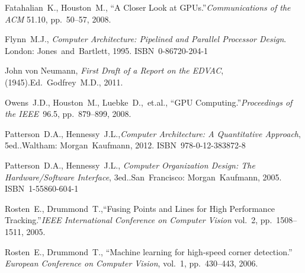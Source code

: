 {\raggedright
	\begin{thebibliography}{99}
		
			Fatahalian~K., Houston~M.,
			``A Closer Look at GPUs.''\linebreak[1]
			\textit{Communications of the ACM} 51.10, pp.~50--57, 2008.
		
			Flynn~M.J.,
			\textit{Computer Architecture: Pipelined and Parallel Processor Design}.
			\linebreak[3]
			London: Jones~and~Bartlett, 1995. ISBN~0-86720-204-1
		
			John von Neumann,
			\textit{First Draft of a Report on the EDVAC}, (1945).\linebreak[2]
			Ed.~Godfrey~M.D., 2011.
		
			Owens~J.D., Houston~M., Luebke~D.,~et.al.,
			``GPU Computing.''\linebreak[1]
			\textit{Proceedings of the IEEE}~96.5, pp.~879--899,
			2008.
		
			Patterson~D.A., Hennessy~J.L.,\linebreak[1]
			\textit{Computer Architecture: A Quantitative Approach},
				5\nth ed..\linebreak[1]
			Waltham: Morgan~Kaufmann, 2012. ISBN~978-0-12-383872-8
		
			Patterson~D.A., Hennessy~J.L., \linebreak[1]
			\textit{Computer Organization Design: %
				The Hardware/Software Interface}, 3\rd ed..\linebreak[1]
			San~Francisco: Morgan~Kaufmann, 2005. ISBN~1-55860-604-1
		
			Rosten~E., Drummond~T.,\linebreak[1]
			``Fusing Points and Lines for High Performance Tracking.''\linebreak[1]
			\textit{IEEE International Conference on Computer Vision} vol.~2,
			pp.~1508--1511, 2005.
		
			Rosten~E., Drummond~T.,
			``Machine learning for high-speed corner detection.''
			\textit{European Conference on Computer Vision}, vol.~1, pp.~430--443,
			2006.
		

\end{thebibliography}}
